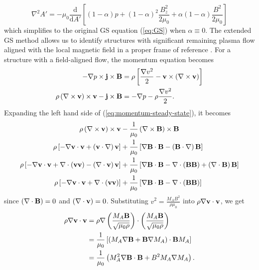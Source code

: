 \begin{equation}
    \nabla^2 A' = -\mu_0\frac{\mathrm{d}}{\mathrm{d}A'}\left[\left(1-\alpha\right)p + \left(1-\alpha\right)^2\frac{B_z^2}{2\mu_0} + \alpha\left(1-\alpha\right)\frac{B^2}{2\mu_0} \right]
    \label{eq:GSextended}
\end{equation}
which simplifies to the original GS equation (\ref{eq:GS}) when $\alpha\equiv 0$. The extended GS method allows us to identify structures with significant remaining plasma flow aligned with the local magnetic field in a proper frame of reference \citep{Chen:2022}. For a structure with a field-aligned flow, the momentum equation becomes
\begin{equation}
    \begin{split}
        -\nabla p \times \mathbf{j}\times\mathbf{B} &= \rho\left[ \frac{\nabla v^2}{2} - \mathbf{v}\times\left( \nabla \times\mathbf{v} \right) \right] \\
        \rho\left( \nabla \times\mathbf{v} \right)\times\mathbf{v} - \mathbf{j}\times\mathbf{B} &= -\nabla p -\rho\frac{\nabla v^2}{2}. \\
    \end{split}
    \label{eq:momentum-steady-state}
\end{equation}
Expanding the left hand side of (\ref{eq:momentum-steady-state}), it becomes
\[
\begin{split}
    \rho\left( \nabla \times\mathbf{v} \right)\times\mathbf{v} &- \frac{1}{\mu_0}\left( \nabla \times\mathbf{B} \right)\times\mathbf{B} \\
    \rho \left[ -\nabla\mathbf{v}\cdot\mathbf{v} + \left( \mathbf{v}\cdot\nabla \right)\mathbf{v} \right] &+ \frac{1}{\mu_0}\left[ \nabla\mathbf{B}\cdot\mathbf{B} - \left( \mathbf{B}\cdot\nabla \right)\mathbf{B} \right] \\
    \rho \left[ -\nabla\mathbf{v}\cdot\mathbf{v} + \nabla \cdot\left( \mathbf{v}\mathbf{v} \right) -\left( \nabla \cdot\mathbf{v} \right)\mathbf{v} \right] &+ \frac{1}{\mu_0}\left[ \nabla\mathbf{B}\cdot\mathbf{B} - \nabla \cdot\left( \mathbf{B}\mathbf{B} \right) + \left( \nabla \cdot\mathbf{B} \right) \mathbf{B} \right] \\
    \rho \left[ -\nabla\mathbf{v}\cdot\mathbf{v} + \nabla \cdot\left( \mathbf{v}\mathbf{v} \right) \right] &+ \frac{1}{\mu_0}\left[ \nabla\mathbf{B}\cdot\mathbf{B} - \nabla \cdot\left( \mathbf{B}\mathbf{B} \right) \right] \\
\end{split}
\]
since $\left( \nabla \cdot\mathbf{B} \right)=0$ and $\left( \nabla \cdot\mathbf{v} \right)=0$. Substituting $v^2 = \frac{M_A B^2}{\rho\mu_0}$ into $\rho\nabla\mathbf{v}\cdot\mathbf{v}$, we get
\[
\begin{split}
    \rho\nabla\mathbf{v}\cdot\mathbf{v} &= \rho\nabla\left( \frac{M_A \mathbf{B}}{\sqrt{\mu_0\rho}} \right)\cdot\left( \frac{M_A \mathbf{B}}{\sqrt{\mu_0\rho}} \right) \\
    &= \frac{1}{\mu_0}\left[ \left( M_A\nabla\mathbf{B} + \mathbf{B}\nabla M_A \right)\cdot\mathbf{B} M_A \right] \\
    &= \frac{1}{\mu_0}\left( M_A^2\nabla\mathbf{B}\cdot\mathbf{B} + B^2 M_A\nabla M_A \right). \\
\end{split}
\]
